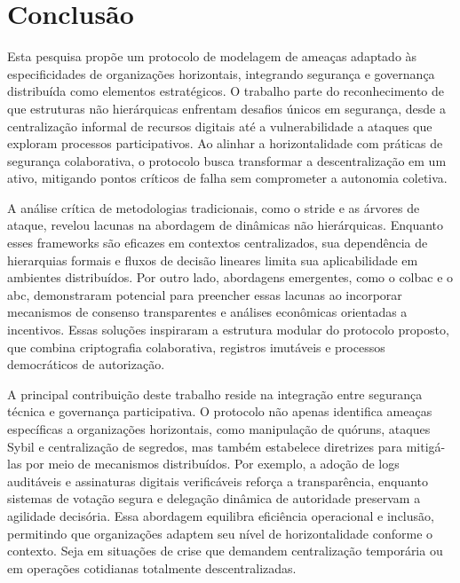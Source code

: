 
%

\chapter{Conclusão}
\label{cha:conclusion}

\glsresetall

Esta pesquisa propõe um protocolo de modelagem de ameaças adaptado às
especificidades de organizações horizontais, integrando segurança e governança
distribuída como elementos estratégicos. O trabalho parte do reconhecimento de
que estruturas não hierárquicas enfrentam desafios únicos em segurança, desde a
centralização informal de recursos digitais até a vulnerabilidade a ataques que
exploram processos participativos. Ao alinhar a horizontalidade com práticas de
segurança colaborativa, o protocolo busca transformar a descentralização em um
ativo, mitigando pontos críticos de falha sem comprometer a autonomia coletiva.

A análise crítica de metodologias tradicionais, como o \gls{stride} e as árvores
de ataque, revelou lacunas na abordagem de dinâmicas não hierárquicas. Enquanto
esses frameworks são eficazes em contextos centralizados, sua dependência de
hierarquias formais e fluxos de decisão lineares limita sua aplicabilidade em
ambientes distribuídos. Por outro lado, abordagens emergentes, como o
\gls{colbac} e o \gls{abc}, demonstraram potencial para preencher essas lacunas
ao incorporar mecanismos de consenso transparentes e análises econômicas
orientadas a incentivos. Essas soluções inspiraram a estrutura modular do
protocolo proposto, que combina criptografia colaborativa, registros imutáveis e
processos democráticos de autorização.

A principal contribuição deste trabalho reside na integração entre segurança
técnica e governança participativa. O protocolo não apenas identifica ameaças
específicas a organizações horizontais, como manipulação de quóruns, ataques
Sybil e centralização de segredos, mas também estabelece diretrizes para
mitigá-las por meio de mecanismos distribuídos. Por exemplo, a adoção de logs
auditáveis e assinaturas digitais verificáveis reforça a transparência, enquanto
sistemas de votação segura e delegação dinâmica de autoridade preservam a
agilidade decisória. Essa abordagem equilibra eficiência operacional e inclusão,
permitindo que organizações adaptem seu nível de horizontalidade conforme o
contexto. Seja em situações de crise que demandem centralização temporária ou em
operações cotidianas totalmente descentralizadas.

